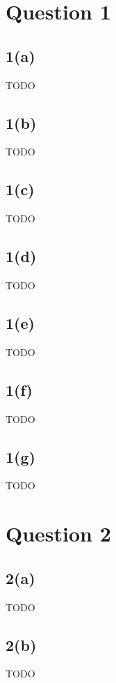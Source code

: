 \documentclass[10pt, a4paper,reqno]{article}
\begin{document}



%
%
\section*{Question 1}

\subsection*{1(a)}
TODO

\subsection*{1(b)}
TODO

\subsection*{1(c)}
TODO

\subsection*{1(d)}
TODO

\subsection*{1(e)}
TODO

\subsection*{1(f)}
TODO

\subsection*{1(g)}
TODO


%
%
\section*{Question 2}

\subsection*{2(a)}
TODO

\subsection*{2(b)}
TODO
\end{document}
